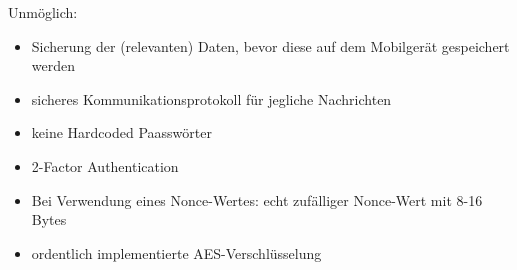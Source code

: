     \noindent Unmöglich:
    \begin{itemize}
        \item Sicherung der (relevanten) Daten, bevor diese auf dem Mobilgerät gespeichert werden\cite{Ye2017}
        \item sicheres Kommunikationsprotokoll für jegliche Nachrichten\cite{Miessler,Ye2017}
        \item keine Hardcoded Paasswörter\cite{Rose2016}
        \item 2-Factor Authentication\cite{Rose2016}
        \item Bei Verwendung eines Nonce-Wertes: echt zufälliger Nonce-Wert mit 8-16 Bytes\cite{Rose2016}
        \item ordentlich implementierte AES-Verschlüsselung\cite{Rose2016}
    \end{itemize}
    